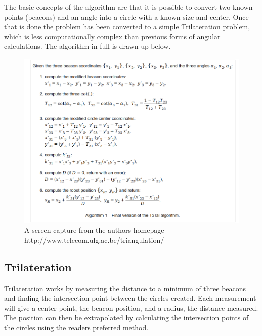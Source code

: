 The basic concepts of the algorithm are that it is possible to convert two known points (beacons) and an angle into a circle with a known size and center. Once that is done the problem has been converted to a simple Trilateration problem, which is less computationally complex than previous forms of angular calculations. The algorithm in full is drawn up below.

\begin{figure}
    \centering
    \includegraphics[width=0.5\linewidth]{positioning/positioning/ToTalAlgorithm}
    \caption{A screen capture from the authors homepage - http://www.telecom.ulg.ac.be/triangulation/}
    \label{fig:totalalgdrawing}
\end{figure}

\subsection{Trilateration}

Trilateration works by measuring the distance to a minimum of three beacons and finding the intersection point between the circles created. Each measurement will give a center point, the beacon position, and a radius, the distance measured. The position can then be extrapolated by calculating the intersection points of the circles using the readers preferred method.

